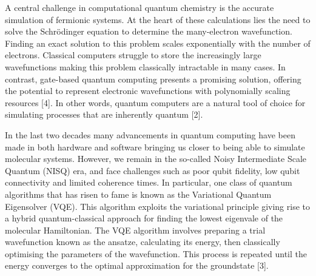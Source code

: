 A central challenge in computational quantum chemistry is the accurate simulation of fermionic systems. At the heart of these calculations lies the need to solve the Schrödinger equation to determine the many-electron wavefunction. Finding an exact solution to this problem scales exponentially with the number of electrons. Classical computers struggle to store the increasingly large wavefunctions making this problem classically intractable in many cases. In contrast, gate-based quantum computing presents a promising solution, offering the potential to represent electronic wavefunctions with polynomially scaling resources [4]. In other words, quantum computers are a natural tool of choice for simulating processes that are inherently quantum [2].

In the last two decades many advancements in quantum computing have been made in both hardware and software bringing us closer to being able to simulate molecular systems. However, we remain in the so-called Noisy Intermediate Scale Quantum (NISQ) era, and face challenges such as poor qubit fidelity, low qubit connectivity and limited coherence times. In particular, one class of quantum algorithms that has risen to fame is known as the Variational Quantum Eigensolver (VQE). This algorithm exploits the variational principle giving rise to a hybrid quantum-classical approach for finding the lowest eigenvale of the molecular Hamiltonian. The VQE algorithm involves preparing a trial wavefunction known as the ansatze, calculating its energy, then classically optimising the parameters of the wavefunction. This process is repeated until the energy converges to the optimal approximation for the groundstate [3]. \cite{Cowtan2019}
